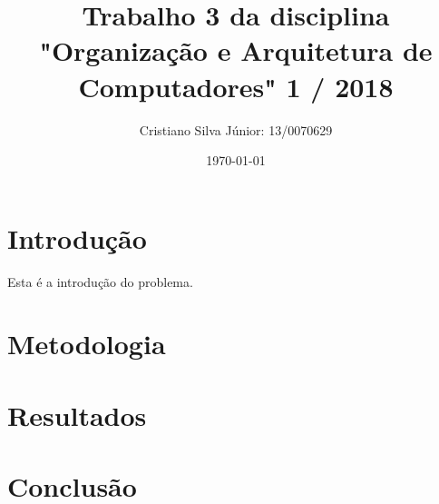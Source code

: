 \documentclass[12pt, a4paper, twoside]{article}
\begin{document}
\title{Trabalho 3 da disciplina "Organização e Arquitetura de Computadores" 1 / 2018}
\author{Cristiano Silva Júnior: 13/0070629}
\date{\today}
\maketitle

\section{Introdução}

Esta é a introdução do problema.

\section{Metodologia}


\section{Resultados}


\section{Conclusão}

\end{document}
